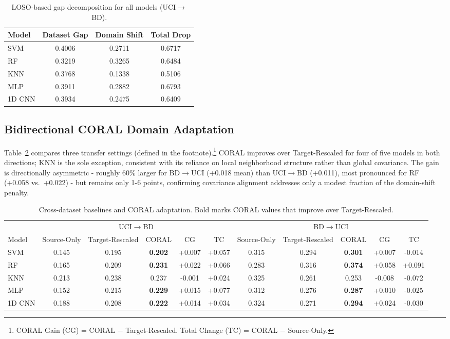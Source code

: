 \documentclass[conference]{IEEEtran}
\begin{document}
\begin{table}[!t]
\centering
\footnotesize
\caption{LOSO-based gap decomposition for all models
(UCI$\rightarrow$BD).}
\label{tab:gap}
\begin{tabular}{lccc}
\hline
Model & Dataset Gap & Domain Shift & Total Drop \\
\hline
SVM & 0.4006 & 0.2711 & 0.6717 \\
RF & 0.3219 & 0.3265 & 0.6484 \\
KNN & 0.3768 & 0.1338 & 0.5106 \\
MLP & 0.3911 & 0.2882 & 0.6793 \\
1D CNN & 0.3934 & 0.2475 & 0.6409 \\
\hline
\end{tabular}
\end{table}

\subsection{Bidirectional CORAL Domain Adaptation}
\label{sec:coral_bidirectional}

Table~\ref{tab:baseline_coral_combined} compares three transfer settings (defined in the footnote).\footnote{CORAL
Gain (CG) = CORAL $-$ Target-Rescaled. Total Change (TC) = CORAL $-$
Source-Only.} CORAL improves over Target-Rescaled for four of five
models in both directions; KNN is the sole exception, consistent with
its reliance on local neighborhood structure rather than global
covariance. The gain is directionally asymmetric - roughly 60\%
larger for BD$\rightarrow$UCI (+0.018 mean) than UCI$\rightarrow$BD
(+0.011), most pronounced for RF (+0.058 vs.\ +0.022) - but remains
only 1-6 points, confirming covariance alignment addresses only a
modest fraction of the domain-shift penalty.

\begin{table}[t]
\centering
\footnotesize
\setlength{\tabcolsep}{5pt}
\caption{Cross-dataset baselines and CORAL adaptation. Bold marks
CORAL values that improve over Target-Rescaled.}
\label{tab:baseline_coral_combined}
\begin{tabular}{lccccc|ccccc}
\hline
& \multicolumn{5}{c|}{UCI$\rightarrow$BD} & \multicolumn{5}{c}{BD$\rightarrow$UCI} \\
Model & Source-Only & Target-Rescaled & CORAL & CG & TC
& Source-Only & Target-Rescaled & CORAL & CG & TC \\
\hline
SVM & 0.145 & 0.195 & \textbf{0.202} & +0.007 & +0.057
& 0.315 & 0.294 & \textbf{0.301} & +0.007 & -0.014 \\
RF & 0.165 & 0.209 & \textbf{0.231} & +0.022 & +0.066
& 0.283 & 0.316 & \textbf{0.374} & +0.058 & +0.091 \\
KNN & 0.213 & 0.238 & 0.237 & -0.001 & +0.024
& 0.325 & 0.261 & 0.253 & -0.008 & -0.072 \\
MLP & 0.152 & 0.215 & \textbf{0.229} & +0.015 & +0.077
& 0.312 & 0.276 & \textbf{0.287} & +0.010 & -0.025 \\
1D CNN & 0.188 & 0.208 & \textbf{0.222} & +0.014 & +0.034
& 0.324 & 0.271 & \textbf{0.294} & +0.024 & -0.030 \\
\hline
\end{tabular}
\end{table}
\end{document}
